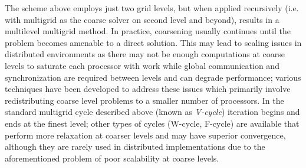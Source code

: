 The scheme above employs just two grid levels, but when applied recursively (i.e. with multigrid as the coarse solver on second level and beyond), results in a multilevel multigrid method.   In practice, coarsening usually continues until the problem becomes amenable to a direct solution.   This may lead to scaling issues in distributed environments as there may not be enough computations at coarse levels to saturate each processor with work while global communication and synchronization are required between levels and can degrade performance; various techniques have been developed to address these issues \cite{Chow2006} which primarily involve redistributing coarse level problems to a smaller number of processors.   In the standard multigrid cycle described above (known as \textit{V-cycle}) iteration begins and ends at the finest level; other types of cycles (W-cycle, F-cycle) are available that perform more relaxation at coarser levels and may have superior convergence, although they are rarely used in distributed implementations due to the aforementioned problem of poor scalability at coarse levels.

